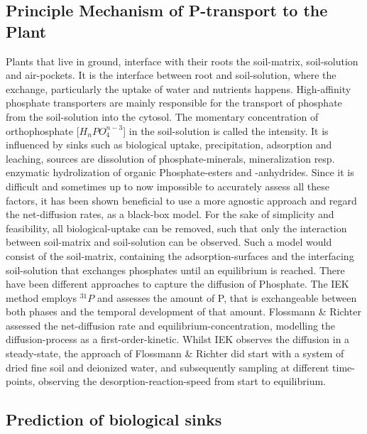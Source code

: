 \documentclass[
  letterpaper,
  DIV=11,
  numbers=noendperiod]{scrartcl}
\begin{document}
\subsection{Principle Mechanism of P-transport to the
Plant}\label{principle-mechanism-of-p-transport-to-the-plant}

Plants that live in ground, interface with their roots the soil-matrix,
soil-solution and air-pockets. It is the interface between root and
soil-solution, where the exchange, particularly the uptake of water and
nutrients happens. High-affinity phosphate transporters are mainly
responsible for the transport of phosphate from the soil-solution into
the cytosol. The momentary concentration of orthophosphate
{[}\(H_nPO_4^{n-3}\){]} in the soil-solution is called the intensity. It
is influenced by sinks such as biological uptake, precipitation,
adsorption and leaching, sources are dissolution of phosphate-minerals,
mineralization resp. enzymatic hydrolization of organic Phosphate-esters
and -anhydrides. Since it is difficult and sometimes up to now
impossible to accurately assess all these factors, it has been shown
beneficial to use a more agnostic approach and regard the net-diffusion
rates, as a black-box model. For the sake of simplicity and feasibility,
all biological-uptake can be removed, such that only the interaction
between soil-matrix and soil-solution can be observed. Such a model
would consist of the soil-matrix, containing the adsorption-surfaces and
the interfacing soil-solution that exchanges phosphates until an
equilibrium is reached. There have been different approaches to capture
the diffusion of Phosphate. The IEK method employs \(^{31}P\) and
assesses the amount of P, that is exchangeable between both phases and
the temporal development of that amount. Flossmann \& Richter assessed
the net-diffusion rate and equilibrium-concentration, modelling the
diffusion-process as a first-order-kinetic. Whilst IEK observes the
diffusion in a steady-state, the approach of Flossmann \& Richter did
start with a system of dried fine soil and deionized water, and
subsequently sampling at different time-points, observing the
desorption-reaction-speed from start to equilibrium.

\subsection{Prediction of biological
sinks}\label{prediction-of-biological-sinks}
\end{document}
